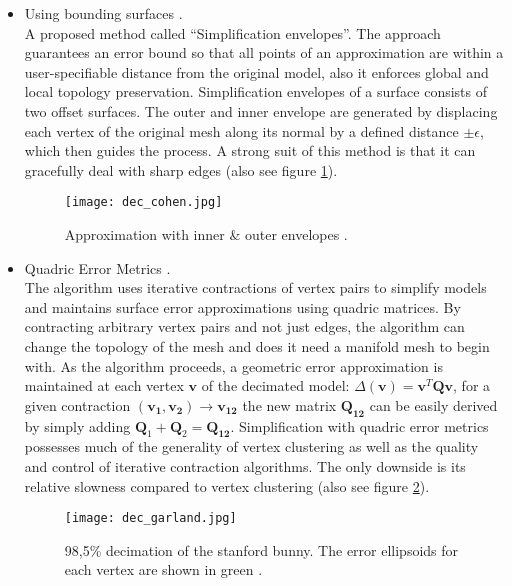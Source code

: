 \begin{itemize}
    \item Using bounding surfaces \citep[cf.][]{Cohen1996}.\\
A proposed method called “Simplification envelopes”.
The approach guarantees an error bound so that all points of an approximation are within a user-specifiable distance from the original model, also it enforces global and local topology preservation.
Simplification envelopes of a surface consists of two offset surfaces.
The outer and inner envelope are generated by displacing each vertex of the original mesh along its normal by a defined distance $\pm\epsilon$, which then guides the process.
A strong suit of this method is that it can gracefully deal with sharp edges (also see figure \ref{fig:dec_cohen}).
\begin{figure}[ht]
\centering
\texttt{[image: dec\_cohen.jpg]}
\caption{Approximation with inner \& outer envelopes \citep[][pp.123-124]{Cohen1996}.}
\label{fig:dec_cohen}
\end{figure}

    \item Quadric Error Metrics \citep[cf.][]{Garland1997}.\\
The algorithm uses iterative contractions of vertex pairs to simplify models and maintains surface error approximations using quadric matrices.
By contracting arbitrary vertex pairs and not just edges, the algorithm can change the topology of the mesh and does it need a manifold mesh to begin with.
As the algorithm proceeds, a geometric error approximation is maintained at each vertex $\mathbf{v}$ of the decimated model: $\Delta(\mathbf{v})= \mathbf{v}^{T}\mathbf{Q}\mathbf{v}$, for a given contraction $(\mathbf{v_{1}},\mathbf{v_{2}}) \rightarrow \mathbf{v_{12}}$ the new matrix $\mathbf{Q_{12}}$ can be easily derived by simply adding $\mathbf{Q}_{1} + \mathbf{Q}_{2} = \mathbf{Q_{12}}$.
Simplification with quadric error metrics possesses much of the generality of vertex clustering as well as the quality and control of iterative contraction algorithms.
The only downside is its relative slowness compared to vertex clustering (also see figure \ref{fig:dec_garland}).
\begin{figure}[ht]
\centering
\texttt{[image: dec\_garland.jpg]}
\caption{98,5\% decimation of the stanford bunny. The error ellipsoids for each vertex are shown in green \citep[][p.215]{Garland1997}.}
\label{fig:dec_garland}
\end{figure}


\end{itemize}
